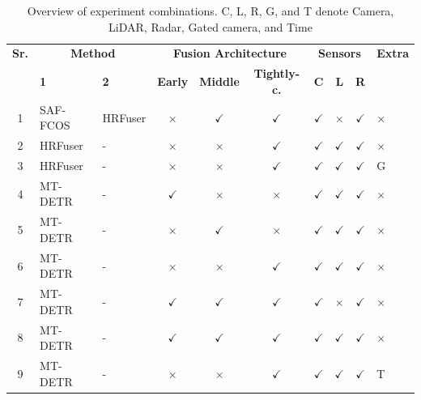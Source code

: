 \documentclass[report.tex]{subfiles}
\begin{document}
\begin{itemize}
                \begin{table}[h!]
                    \centering
                    \caption{Overview of experiment combinations. C, L, R, G, and T denote Camera, LiDAR, Radar, Gated camera, and Time}
                    \begin{tabular}{|c|l|l|c|c|c|c|c|c|l|}
                    \hline
                    \textbf{Sr.} & \multicolumn{2}{c|}{\textbf{Method}} & \multicolumn{3}{c|}{\textbf{Fusion Architecture}} & \multicolumn{3}{c|}{\textbf{Sensors}} & \textbf{Extra} \\
                    \cline{2-9}
                     & \textbf{1} & \textbf{2} & \textbf{Early} & \textbf{Middle} & \textbf{Tightly-c.} & \textbf{C} & \textbf{L} & \textbf{R} &  \\
                    \hline
                    1 & SAF-FCOS & HRFuser & $\times$ & $\checkmark$ & $\checkmark$ & $\checkmark$ & $\times$ & $\checkmark$ & $\times$ \\
                    \hline
                    2 & HRFuser & - & $\times$ & $\times$ & $\checkmark$ & $\checkmark$ & $\checkmark$ & $\checkmark$ & $\times$ \\
                    \hline
                    3 & HRFuser & - & $\times$ & $\times$ & $\checkmark$ & $\checkmark$ & $\checkmark$ & $\checkmark$ & G \\
                    \hline
                    4 & MT-DETR & - & $\checkmark$ & $\times$ & $\times$ & $\checkmark$ & $\checkmark$ & $\checkmark$ & $\times$ \\
                    \hline
                    5 & MT-DETR & - & $\times$ & $\checkmark$ & $\times$ & $\checkmark$ & $\checkmark$ & $\checkmark$ & $\times$ \\
                    \hline
                    6 & MT-DETR & - & $\times$ & $\times$ & $\checkmark$ & $\checkmark$ & $\checkmark$ & $\checkmark$ & $\times$ \\
                    \hline
                    7 & MT-DETR & - & $\checkmark$ & $\checkmark$ & $\checkmark$ & $\checkmark$ & $\times$ & $\checkmark$ & $\times$ \\
                    \hline
                    8 & MT-DETR & - & $\checkmark$ & $\checkmark$ & $\checkmark$ & $\checkmark$ & $\checkmark$ & $\checkmark$ & $\times$ \\
                    \hline
                    9 & MT-DETR & - & $\times$ & $\times$ & $\checkmark$ & $\checkmark$ & $\checkmark$ & $\checkmark$ & T \\

\end{tabular}
\end{table}
\end{itemize}
\end{document}
